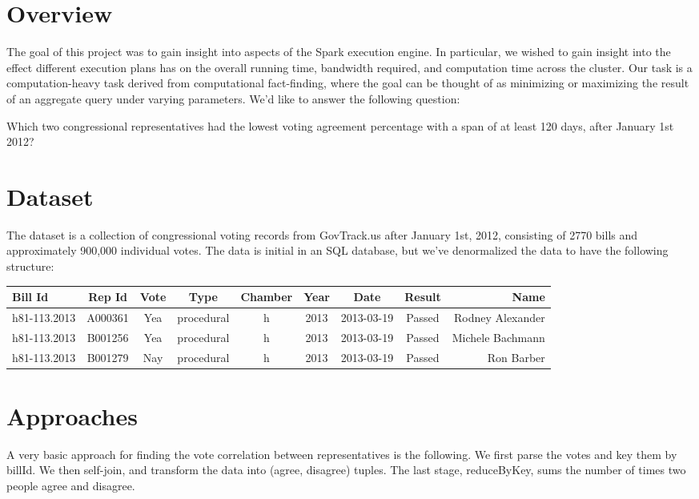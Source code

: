 \documentclass[11pt]{article}
\begin{document}
\maketitle
\section{Overview}
The goal of this project was to gain insight into aspects of the Spark execution engine. In particular, we wished to gain insight into the effect different execution plans has on the overall running time, bandwidth required, and computation time across the cluster. Our task is a computation-heavy task derived from computational fact-finding\cite{cohen2011computational}, where the goal can be thought of as minimizing or maximizing the result of an aggregate query under varying parameters. We'd like to answer the following question:

Which two congressional representatives had the lowest voting agreement percentage with a span of at least 120 days, after January 1st 2012?

\section{Dataset}
The dataset is a collection of congressional voting records from GovTrack.us after January 1st, 2012, consisting of 2770 bills and approximately 900,000 individual votes. The data is initial in an SQL database, but we've denormalized the data to have the following structure:

\begin{table}[h!]
\begin{adjustbox}{max width=\textwidth}
\begin{tabular}{ | l | c | c | c | c | c | c | c | r | }
\hline
Bill Id & Rep Id & Vote & Type & Chamber & Year & Date & Result & Name\\
\hline
h81-113.2013 & A000361 & Yea & procedural & h & 2013 & 2013-03-19 & Passed & Rodney Alexander\\
h81-113.2013 & B001256 & Yea & procedural & h & 2013 & 2013-03-19 & Passed & Michele Bachmann\\
h81-113.2013 & B001279 & Nay & procedural & h & 2013 & 2013-03-19 & Passed & Ron Barber\\
\hline
\end{tabular}
\end{adjustbox}
\end{table}


\section{Approaches}
A very basic approach for finding the vote correlation between representatives is the following. We first parse the votes and key them by billId. We then self-join, and transform the data into (agree, disagree) tuples. The last stage, reduceByKey, sums the number of times two people agree and disagree.  
\end{document}
